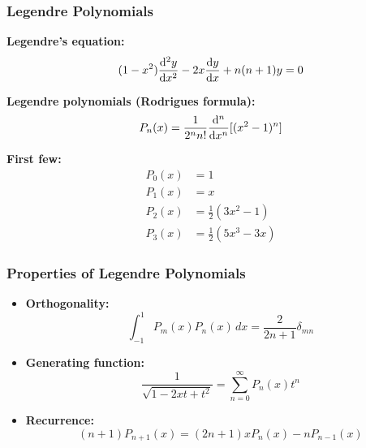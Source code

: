 \documentclass[12pt,a4paper]{article}
\begin{document}
\subsubsection{Legendre Polynomials}
\begin{formulabox}
\textbf{Legendre's equation:}
\begin{equation}
(1-x^2)\dv[2]{y}{x} - 2x\dv{y}{x} + n(n+1)y = 0
\end{equation}

\textbf{Legendre polynomials (Rodrigues formula):}
\begin{equation}
P_n(x) = \frac{1}{2^n n!}\dv[n]{}{x}[(x^2-1)^n]
\end{equation}

\textbf{First few:}
\begin{align}
P_0(x) &= 1 \\
P_1(x) &= x \\
P_2(x) &= \frac{1}{2}(3x^2 - 1) \\
P_3(x) &= \frac{1}{2}(5x^3 - 3x)
\end{align}
\end{formulabox}

\subsubsection{Properties of Legendre Polynomials}
\begin{itemize}
    \item \textbf{Orthogonality:}
    \begin{equation}
    \int_{-1}^1 P_m(x) P_n(x) \, dx = \frac{2}{2n+1}\delta_{mn}
    \end{equation}
    \item \textbf{Generating function:}
    \begin{equation}
    \frac{1}{\sqrt{1-2xt+t^2}} = \sum_{n=0}^{\infty} P_n(x) t^n
    \end{equation}
    \item \textbf{Recurrence:}
    \begin{equation}
    (n+1)P_{n+1}(x) = (2n+1)xP_n(x) - nP_{n-1}(x)
    \end{equation}
\end{itemize}
\end{document}
